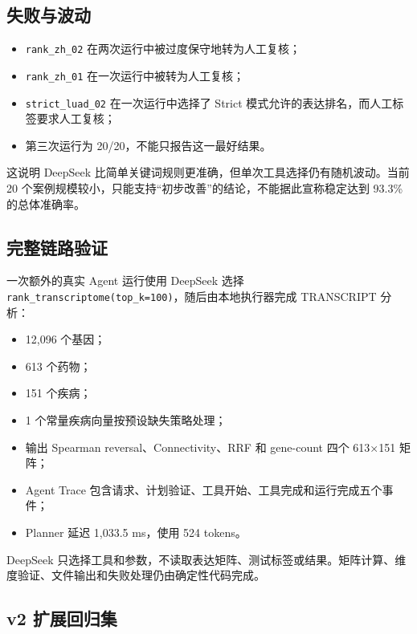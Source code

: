 \documentclass[
  10pt,
]{ctexart}
\providecommand{\tightlist}{%
  \setlength{\itemsep}{0pt}\setlength{\parskip}{0pt}}
\begin{document}
\subsection{失败与波动}\label{ux5931ux8d25ux4e0eux6ce2ux52a8}

\begin{itemize}
\tightlist
\item
  \texttt{rank\_\allowbreak{}zh\_\allowbreak{}02} 在两次运行中被过度保守地转为人工复核；
\item
  \texttt{rank\_\allowbreak{}zh\_\allowbreak{}01} 在一次运行中被转为人工复核；
\item
  \texttt{strict\_\allowbreak{}luad\_\allowbreak{}02} 在一次运行中选择了 Strict
  模式允许的表达排名，而人工标签要求人工复核；
\item
  第三次运行为 20/20，不能只报告这一最好结果。
\end{itemize}

这说明 DeepSeek 比简单关键词规则更准确，但单次工具选择仍有随机波动。当前
20 个案例规模较小，只能支持``初步改善''的结论，不能据此宣称稳定达到
93.3\% 的总体准确率。

\subsection{完整链路验证}\label{ux5b8cux6574ux94feux8defux9a8cux8bc1}

一次额外的真实 Agent 运行使用 DeepSeek 选择
\texttt{rank\_\allowbreak{}transcriptome(top\_\allowbreak{}k=100)}，随后由本地执行器完成
TRANSCRIPT 分析：

\begin{itemize}
\tightlist
\item
  12,096 个基因；
\item
  613 个药物；
\item
  151 个疾病；
\item
  1 个常量疾病向量按预设缺失策略处理；
\item
  输出 Spearman reversal、Connectivity、RRF 和 gene-count 四个 613×151
  矩阵；
\item
  Agent Trace 包含请求、计划验证、工具开始、工具完成和运行完成五个事件；
\item
  Planner 延迟 1,033.5 ms，使用 524 tokens。
\end{itemize}

DeepSeek
只选择工具和参数，不读取表达矩阵、测试标签或结果。矩阵计算、维度验证、文件输出和失败处理仍由确定性代码完成。

\subsection{v2 扩展回归集}\label{v2-ux6269ux5c55ux56deux5f52ux96c6}
\end{document}
